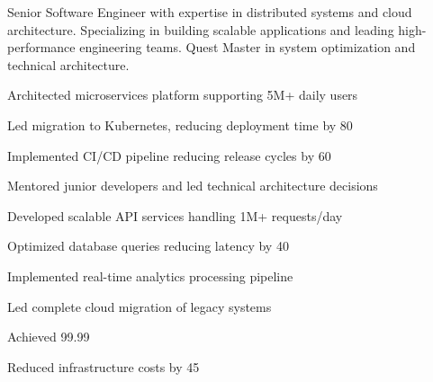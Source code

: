 \documentclass[withhyper]{gamifiedcv}
\begin{document}
\begin{paracol}{2}

Senior Software Engineer with expertise in distributed systems and cloud architecture. 
Specializing in building scalable applications and leading high-performance engineering teams. 
Quest Master in system optimization and technical architecture.


\begin{jobdescription}
    \item Architected microservices platform supporting 5M+ daily users
    \item Led migration to Kubernetes, reducing deployment time by 80%
    \item Implemented CI/CD pipeline reducing release cycles by 60%
    \item Mentored junior developers and led technical architecture decisions
\end{jobdescription}

\begin{jobdescription}
    \item Developed scalable API services handling 1M+ requests/day
    \item Optimized database queries reducing latency by 40%
    \item Implemented real-time analytics processing pipeline
\end{jobdescription}


\begin{jobdescription}
    \item Led complete cloud migration of legacy systems
    \item Achieved 99.99%
    \item Reduced infrastructure costs by 45%
\end{jobdescription}


\end{paracol}
\end{document}
